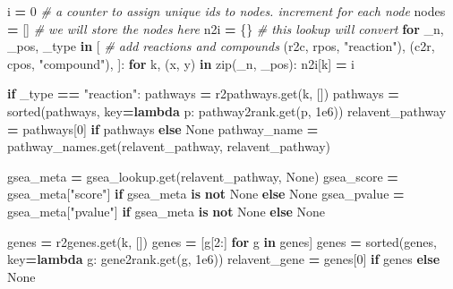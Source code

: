 \documentclass[
]{book}
\newenvironment{Shaded}{\begin{snugshade}}{\end{snugshade}}
\newcommand{\BuiltInTok}[1]{#1}
\newcommand{\CommentTok}[1]{\textcolor[rgb]{0.56,0.35,0.01}{\textit{#1}}}
\newcommand{\ControlFlowTok}[1]{\textcolor[rgb]{0.13,0.29,0.53}{\textbf{#1}}}
\newcommand{\DecValTok}[1]{\textcolor[rgb]{0.00,0.00,0.81}{#1}}
\newcommand{\FloatTok}[1]{\textcolor[rgb]{0.00,0.00,0.81}{#1}}
\newcommand{\KeywordTok}[1]{\textcolor[rgb]{0.13,0.29,0.53}{\textbf{#1}}}
\newcommand{\NormalTok}[1]{#1}
\newcommand{\OperatorTok}[1]{\textcolor[rgb]{0.81,0.36,0.00}{\textbf{#1}}}
\newcommand{\StringTok}[1]{\textcolor[rgb]{0.31,0.60,0.02}{#1}}
\newcommand{\VariableTok}[1]{\textcolor[rgb]{0.00,0.00,0.00}{#1}}
\begin{document}
\begin{Shaded}
\begin{Highlighting}[numbers=left,,]
\NormalTok{i }\OperatorTok{=} \DecValTok{0}       \CommentTok{\# a counter to assign unique ids to nodes. increment for each node}
\NormalTok{nodes }\OperatorTok{=}\NormalTok{ []  }\CommentTok{\# we will store the nodes here}
\NormalTok{n2i }\OperatorTok{=}\NormalTok{ \{\}    }\CommentTok{\# this lookup will convert }
\ControlFlowTok{for}\NormalTok{ \_n, \_pos, \_type }\KeywordTok{in}\NormalTok{ [    }\CommentTok{\# add reactions and compounds}
\NormalTok{    (r2c, rpos, }\StringTok{"reaction"}\NormalTok{),}
\NormalTok{    (c2r, cpos, }\StringTok{"compound"}\NormalTok{),}
\NormalTok{]:}
    \ControlFlowTok{for}\NormalTok{ k, (x, y) }\KeywordTok{in} \BuiltInTok{zip}\NormalTok{(\_n, \_pos):}
\NormalTok{        n2i[k] }\OperatorTok{=}\NormalTok{ i}

        \ControlFlowTok{if}\NormalTok{ \_type }\OperatorTok{==} \StringTok{"reaction"}\NormalTok{:}
\NormalTok{            pathways }\OperatorTok{=}\NormalTok{ r2pathways.get(k, [])}
\NormalTok{            pathways }\OperatorTok{=} \BuiltInTok{sorted}\NormalTok{(pathways, key}\OperatorTok{=}\KeywordTok{lambda}\NormalTok{ p: pathway2rank.get(p, }\FloatTok{1e6}\NormalTok{))}
\NormalTok{            relavent\_pathway }\OperatorTok{=}\NormalTok{ pathways[}\DecValTok{0}\NormalTok{] }\ControlFlowTok{if}\NormalTok{ pathways }\ControlFlowTok{else} \VariableTok{None}
\NormalTok{            pathway\_name }\OperatorTok{=}\NormalTok{ pathway\_names.get(relavent\_pathway, relavent\_pathway)}
            
\NormalTok{            gsea\_meta }\OperatorTok{=}\NormalTok{ gsea\_lookup.get(relavent\_pathway, }\VariableTok{None}\NormalTok{)}
\NormalTok{            gsea\_score }\OperatorTok{=}\NormalTok{ gsea\_meta[}\StringTok{"score"}\NormalTok{] }\ControlFlowTok{if}\NormalTok{ gsea\_meta }\KeywordTok{is} \KeywordTok{not} \VariableTok{None} \ControlFlowTok{else} \VariableTok{None}
\NormalTok{            gsea\_pvalue }\OperatorTok{=}\NormalTok{ gsea\_meta[}\StringTok{"pvalue"}\NormalTok{] }\ControlFlowTok{if}\NormalTok{ gsea\_meta }\KeywordTok{is} \KeywordTok{not} \VariableTok{None} \ControlFlowTok{else} \VariableTok{None}
            
\NormalTok{            genes }\OperatorTok{=}\NormalTok{ r2genes.get(k, [])}
\NormalTok{            genes }\OperatorTok{=}\NormalTok{ [g[}\DecValTok{2}\NormalTok{:] }\ControlFlowTok{for}\NormalTok{ g }\KeywordTok{in}\NormalTok{ genes]}
\NormalTok{            genes }\OperatorTok{=} \BuiltInTok{sorted}\NormalTok{(genes, key}\OperatorTok{=}\KeywordTok{lambda}\NormalTok{ g: gene2rank.get(g, }\FloatTok{1e6}\NormalTok{))}
\NormalTok{            relavent\_gene }\OperatorTok{=}\NormalTok{ genes[}\DecValTok{0}\NormalTok{] }\ControlFlowTok{if}\NormalTok{ genes }\ControlFlowTok{else} \VariableTok{None}
            

\end{Highlighting}
\end{Shaded}
\end{document}
